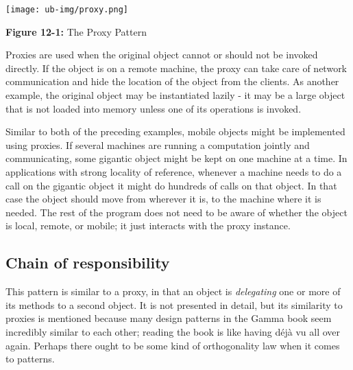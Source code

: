 \texttt{[image: ub-img/proxy.png]}

{\sffamily\bfseries Figure 12-1:}
{\sffamily The Proxy Pattern}

\bigskip

Proxies are used when the original object cannot or should not be
invoked directly. If the object is on a remote machine, the proxy can
take care of network communication and hide the location of the object
from the clients. As another example, the original object may be
instantiated lazily - it may be a large object that is not loaded into
memory unless one of its operations is invoked.

Similar to both of the preceding examples, mobile objects might be
implemented using proxies. If several machines are running a
computation jointly and communicating, some gigantic object might be
kept on one machine at a time. In applications with strong locality of
reference, whenever a machine needs to do a call on the gigantic object
it might do hundreds of calls on that object. In that case the object
should move from wherever it is, to the machine where it is needed. The
rest of the program does not need to be aware of whether the object is
local, remote, or mobile; it just interacts with the proxy instance.


\subsection*{Chain of responsibility}

This pattern is similar to a proxy, in that an object is
\textit{delegating} one or more of its methods to a second object. It
is not presented in detail, but its similarity to proxies is mentioned
because many design patterns in the Gamma book seem incredibly similar
to each other; reading the book is like having d\'{e}j\`{a} vu all over again.
Perhaps there ought to be some kind of orthogonality law when it comes
to patterns.

